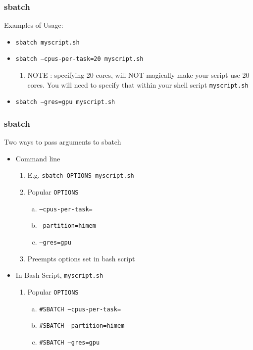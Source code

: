 \documentclass{beamer}
\newcommand{\code}[1]{\colorbox{codegray}{\texttt{#1}}}
\begin{document}
\begin{frame}
\frametitle{sbatch}
Examples of Usage:
\bigskip
\begin{itemize}
    \item \code{sbatch myscript.sh}
    \bigskip
    \pause
    \item \code{sbatch --cpus-per-task=20 myscript.sh}
    \bigskip
    \pause
    \begin{enumerate}
        \item NOTE : specifying 20 cores, will NOT magically make your script use 20 cores.
                     You will need to specify that within your shell script \code{myscript.sh}
    \end{enumerate}
    \pause
    \item \code{sbatch --gres=gpu myscript.sh}
    \bigskip
\end{itemize}
\end{frame}



\begin{frame}
\frametitle{sbatch}
Two ways to pass arguments to sbatch
\smallskip
\begin{itemize}
    \item Command line
        \smallskip
        \begin{enumerate}
            \item E.g. \code{sbatch OPTIONS myscript.sh}
            \pause
            \smallskip
            \item Popular \code{OPTIONS}
            \begin{enumerate}[a)]
                \item \code{--cpus-per-task=} 
                \pause
                \smallskip
                \item \code{--partition=himem}
                \pause
                \smallskip
                \item \code{--gres=gpu}
            \end{enumerate}
            \pause
            \smallskip
            \item Preempts options set in bash script
        \end{enumerate}
        \smallskip

    \pause
    \item In Bash Script, \code{myscript.sh}
        \pause
        \smallskip
        \begin{enumerate}
            \item Popular \code{OPTIONS}
            \pause
            \begin{enumerate}[a)]
                \item \code{\#SBATCH --cpus-per-task=} 
                \pause
                \smallskip
                \item \code{\#SBATCH --partition=himem}
                \pause
                \smallskip
                \item \code{\#SBATCH --gres=gpu}
            \end{enumerate}
        \end{enumerate}
\end{itemize}
\end{frame}
\end{document}
